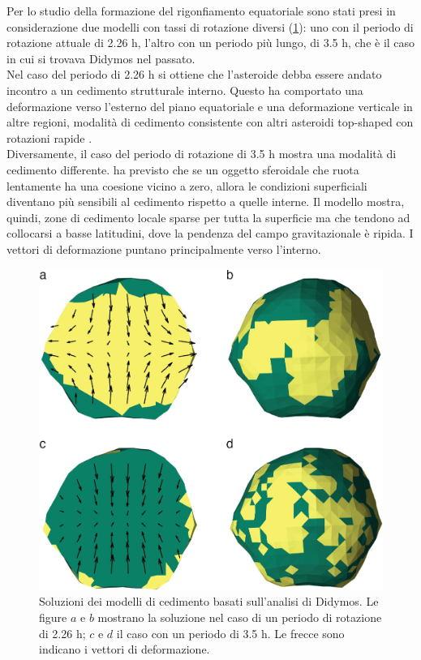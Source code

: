 \documentclass[a4paper,11pt,openright]{book}
\begin{document}
Per lo studio della formazione del rigonfiamento equatoriale sono stati presi in considerazione due modelli con tassi di rotazione diversi (\cref{fig:failure_models}): uno con il periodo di rotazione attuale di 2.26 h, l'altro con un periodo più lungo, di 3.5 h, che è il caso in cui si trovava Didymos nel passato.\\
Nel caso del periodo di 2.26 h si ottiene che l'asteroide debba essere andato incontro a un cedimento strutturale interno. Questo ha comportato una deformazione verso l'esterno del piano equatoriale e una deformazione verticale in altre regioni, modalità di cedimento consistente con altri asteroidi top-shaped con rotazioni rapide \citep{hirabayashi_rotationally_2019}.\\
Diversamente, il caso del periodo di rotazione di 3.5 h mostra una modalità di cedimento differente. \citet{hirabayashi_failure_2015} ha previsto che se un oggetto sferoidale che ruota lentamente ha una coesione vicino a zero, allora le condizioni superficiali diventano più sensibili al cedimento rispetto a quelle interne. Il modello mostra, quindi, zone di cedimento locale sparse per tutta la superficie ma che tendono ad collocarsi a basse latitudini, dove la pendenza del campo gravitazionale è ripida. I vettori di deformazione puntano principalmente verso l'interno.

\begin{figure}
    \centering
    \includegraphics[scale=0.6]{figure/failure_models.jpg}
    \caption[Soluzioni dei modelli di cedimento basati sull'analisi di Didymos.]{Soluzioni dei modelli di cedimento basati sull'analisi di Didymos. Le figure $a$ e $b$ mostrano la soluzione nel caso di un periodo di rotazione di 2.26 h; $c$ e $d$ il caso con un periodo di 3.5 h. Le frecce sono indicano i vettori di deformazione. \citep{naidu_radar_2020}}
    \label{fig:failure_models}
\end{figure}
\end{document}
